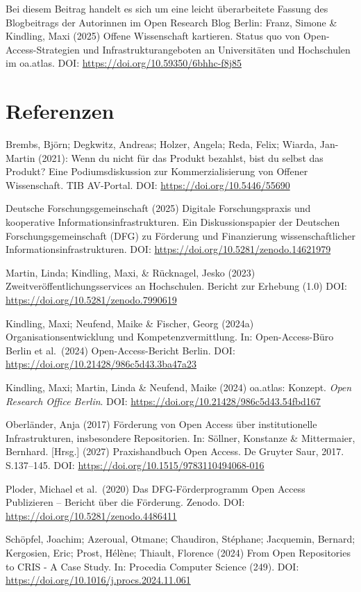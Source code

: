 \documentclass[a4paper,
fontsize=11pt,
oneside,
numbers=noperiodatend,
parskip=half-,
bibliography=totoc,
final
]{scrartcl}
\begin{document}
Bei diesem Beitrag handelt es sich um eine leicht überarbeitete Fassung
des Blogbeitrags der Autorinnen im Open Research Blog Berlin: Franz,
Simone \& Kindling, Maxi (2025) Offene Wissenschaft kartieren. Status
quo von Open-Access-Strategien und Infrastrukturangeboten an
Universitäten und Hochschulen im oa.atlas. DOI:
\url{https://doi.org/10.59350/6bhhc-f8j85}

\section{Referenzen}\label{referenzen}

Brembs, Björn; Degkwitz, Andreas; Holzer, Angela; Reda, Felix; Wiarda,
Jan-Martin (2021): Wenn du nicht für das Produkt bezahlst, bist du
selbst das Produkt? Eine Podiumsdiskussion zur Kommerzialisierung von
Offener Wissenschaft. TIB AV-Portal. DOI:
\url{https://doi.org/10.5446/55690}

Deutsche Forschungsgemeinschaft (2025) Digitale Forschungspraxis und
kooperative Informationsinfrastrukturen. Ein Diskussionspapier der
Deutschen Forschungsgemeinschaft (DFG) zu Förderung und Finanzierung
wissenschaftlicher Informationsinfrastrukturen. DOI:
\url{https://doi.org/10.5281/zenodo.14621979}

Martin, Linda; Kindling, Maxi, \& Rücknagel, Jesko (2023)
Zweitveröffentlichungsservices an Hochschulen. Bericht zur Erhebung
(1.0) DOI: \url{https://doi.org/10.5281/zenodo.7990619}

Kindling, Maxi; Neufend, Maike \& Fischer, Georg (2024a)
Organisationsentwicklung und Kompetenzvermittlung. In: Open-Access-Büro
Berlin et al.~(2024) Open-Access-Bericht Berlin. DOI:
\url{https://doi.org/10.21428/986c5d43.3ba47a23}

Kindling, Maxi; Martin, Linda \& Neufend, Maike (2024) oa.atlas:
Konzept. \emph{Open Research Office Berlin}. DOI:
\url{https://doi.org/10.21428/986c5d43.54fbd167}

Oberländer, Anja (2017) Förderung von Open Access über institutionelle
Infrastrukturen, insbesondere Repositorien. In: Söllner, Konstanze \&
Mittermaier, Bernhard. {[}Hrsg.{]} (2027) Praxishandbuch Open Access. De
Gruyter Saur, 2017. S.137--145. DOI:
\url{https://doi.org/10.1515/9783110494068-016}

Ploder, Michael et al.~(2020) Das DFG-Förderprogramm Open Access
Publizieren -- Bericht über die Förderung. Zenodo. DOI:
\url{https://doi.org/10.5281/zenodo.4486411}

Schöpfel, Joachim; Azeroual, Otmane; Chaudiron, Stéphane; Jacquemin,
Bernard; Kergosien, Eric; Prost, Hélène; Thiault, Florence (2024) From
Open Repositories to CRIS - A Case Study. In: Procedia Computer Science
(249). DOI: \url{https://doi.org/10.1016/j.procs.2024.11.061}
\end{document}
